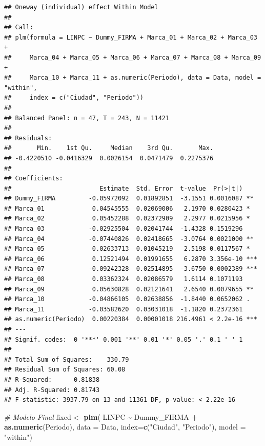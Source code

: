 \documentclass[
]{book}
\newenvironment{Shaded}{\begin{snugshade}}{\end{snugshade}}
\newcommand{\AttributeTok}[1]{\textcolor[rgb]{0.13,0.29,0.53}{#1}}
\newcommand{\CommentTok}[1]{\textcolor[rgb]{0.56,0.35,0.01}{\textit{#1}}}
\newcommand{\FunctionTok}[1]{\textcolor[rgb]{0.13,0.29,0.53}{\textbf{#1}}}
\newcommand{\NormalTok}[1]{#1}
\newcommand{\OtherTok}[1]{\textcolor[rgb]{0.56,0.35,0.01}{#1}}
\newcommand{\SpecialCharTok}[1]{\textcolor[rgb]{0.81,0.36,0.00}{\textbf{#1}}}
\newcommand{\StringTok}[1]{\textcolor[rgb]{0.31,0.60,0.02}{#1}}
\begin{document}
\begin{verbatim}
## Oneway (individual) effect Within Model
## 
## Call:
## plm(formula = LINPC ~ Dummy_FIRMA + Marca_01 + Marca_02 + Marca_03 + 
##     Marca_04 + Marca_05 + Marca_06 + Marca_07 + Marca_08 + Marca_09 + 
##     Marca_10 + Marca_11 + as.numeric(Periodo), data = Data, model = "within", 
##     index = c("Ciudad", "Periodo"))
## 
## Balanced Panel: n = 47, T = 243, N = 11421
## 
## Residuals:
##       Min.    1st Qu.     Median    3rd Qu.       Max. 
## -0.4220510 -0.0416329  0.0026154  0.0471479  0.2275376 
## 
## Coefficients:
##                        Estimate  Std. Error  t-value  Pr(>|t|)    
## Dummy_FIRMA         -0.05972092  0.01892851  -3.1551 0.0016087 ** 
## Marca_01             0.04545555  0.02069006   2.1970 0.0280423 *  
## Marca_02             0.05452288  0.02372909   2.2977 0.0215956 *  
## Marca_03            -0.02925504  0.02041744  -1.4328 0.1519296    
## Marca_04            -0.07440826  0.02418665  -3.0764 0.0021000 ** 
## Marca_05             0.02633713  0.01045219   2.5198 0.0117567 *  
## Marca_06             0.12521494  0.01991655   6.2870 3.356e-10 ***
## Marca_07            -0.09242328  0.02514895  -3.6750 0.0002389 ***
## Marca_08             0.03362324  0.02086579   1.6114 0.1071193    
## Marca_09             0.05630828  0.02121641   2.6540 0.0079655 ** 
## Marca_10            -0.04866105  0.02638856  -1.8440 0.0652062 .  
## Marca_11            -0.03582620  0.03031018  -1.1820 0.2372361    
## as.numeric(Periodo)  0.00220384  0.00001018 216.4961 < 2.2e-16 ***
## ---
## Signif. codes:  0 '***' 0.001 '**' 0.01 '*' 0.05 '.' 0.1 ' ' 1
## 
## Total Sum of Squares:    330.79
## Residual Sum of Squares: 60.08
## R-Squared:      0.81838
## Adj. R-Squared: 0.81743
## F-statistic: 3937.79 on 13 and 11361 DF, p-value: < 2.22e-16
\end{verbatim}

\begin{Shaded}
\begin{Highlighting}[]
\CommentTok{\# Modelo Final}
\NormalTok{fixed }\OtherTok{\textless{}{-}} \FunctionTok{plm}\NormalTok{( LINPC }\SpecialCharTok{\textasciitilde{}}\NormalTok{ Dummy\_FIRMA }\SpecialCharTok{+} \FunctionTok{as.numeric}\NormalTok{(Periodo),}
             \AttributeTok{data =}\NormalTok{ Data, }
             \AttributeTok{index=}\FunctionTok{c}\NormalTok{(}\StringTok{"Ciudad"}\NormalTok{, }\StringTok{"Periodo"}\NormalTok{), }
             \AttributeTok{model =} \StringTok{"within"}\NormalTok{)}
\end{Highlighting}
\end{Shaded}
\end{document}
